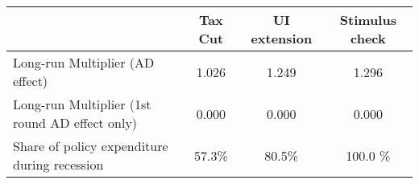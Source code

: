 \begin{tabular}{@{}lccc@{}} 
\toprule 
& Tax Cut    & UI extension    & Stimulus check    \\  \midrule 
Long-run Multiplier (AD effect) &1.026  & 1.249  & 1.296     \\ 
Long-run Multiplier (1st round AD effect only) &0.000  & 0.000  & 0.000     \\ 
Share of policy expenditure during recession &57.3\%  & 80.5\%  & 100.0 \%    \\ 
\end{tabular}  
